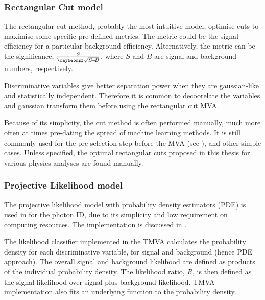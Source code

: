 
\subsubsection{Rectangular Cut model}

The rectangular cut method, probably the most intuitive model, optimise cuts to maximise some specific pre-defined metrics. The metric could be the signal efficiency for a particular background efficiency. Alternatively, the metric can be the significance, $\frac{S}{\rootOf{S\!+\!B}}$, where $S$ and $B$ are signal and background numbers, respectively.

Discriminative variables give better separation power when they are gaussian-like and statistically independent. Therefore it is common to decoorelate  the variables and gaussian transform them before using the rectangular cut MVA.

Because of its simplicity, the cut method is often performed manually, much more often at times pre-dating the spread of machine learning methods. It is still commonly used for the pre-selection step before the MVA (see ), and other simple cases. Unless specified, the optimal rectangular cuts proposed in this thesis for various physics analyses are found manually.

\subsubsection{Projective Likelihood model}
\label{sec:pandoraLikelihood}

The projective likelihood model with probability density estimators (PDE) is used in \pandora for the photon ID,  due to its simplicity and low requirement on computing resources. The \pandora implementation is discussed  in .

The likelihood classifier implemented in the TMVA calculates the probability density for each discriminative variable, for signal and background (hence PDE approach). The overall signal and background likelihood are defined as products of the individual probability density. The likelihood ratio, $R$, is then defined as the signal likelihood over signal plus background likelihood. TMVA implementation also fits an underlying function to the probability density.

